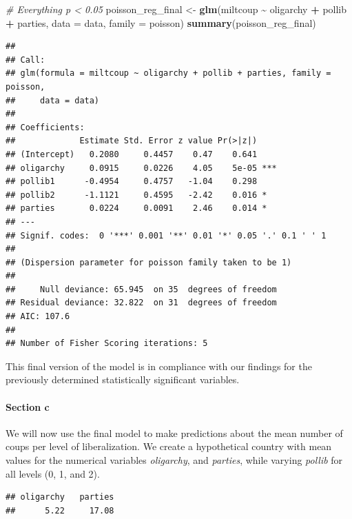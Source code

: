 \documentclass[
  11pt,
]{article}
\newenvironment{Shaded}{\begin{snugshade}}{\end{snugshade}}
\newcommand{\AttributeTok}[1]{\textcolor[rgb]{0.13,0.29,0.53}{#1}}
\newcommand{\CommentTok}[1]{\textcolor[rgb]{0.56,0.35,0.01}{\textit{#1}}}
\newcommand{\FunctionTok}[1]{\textcolor[rgb]{0.13,0.29,0.53}{\textbf{#1}}}
\newcommand{\NormalTok}[1]{#1}
\newcommand{\OtherTok}[1]{\textcolor[rgb]{0.56,0.35,0.01}{#1}}
\newcommand{\SpecialCharTok}[1]{\textcolor[rgb]{0.81,0.36,0.00}{\textbf{#1}}}
\begin{document}
\begin{Shaded}
\begin{Highlighting}[]
\CommentTok{\# Everything p \textless{} 0.05}
\NormalTok{poisson\_reg\_final }\OtherTok{\textless{}{-}} \FunctionTok{glm}\NormalTok{(miltcoup }\SpecialCharTok{\textasciitilde{}}\NormalTok{ oligarchy }\SpecialCharTok{+}\NormalTok{ pollib }\SpecialCharTok{+}\NormalTok{ parties, }
                    \AttributeTok{data =}\NormalTok{ data,}
                    \AttributeTok{family =}\NormalTok{ poisson)}
\FunctionTok{summary}\NormalTok{(poisson\_reg\_final)}
\end{Highlighting}
\end{Shaded}

\begin{verbatim}
## 
## Call:
## glm(formula = miltcoup ~ oligarchy + pollib + parties, family = poisson, 
##     data = data)
## 
## Coefficients:
##             Estimate Std. Error z value Pr(>|z|)    
## (Intercept)   0.2080     0.4457    0.47    0.641    
## oligarchy     0.0915     0.0226    4.05    5e-05 ***
## pollib1      -0.4954     0.4757   -1.04    0.298    
## pollib2      -1.1121     0.4595   -2.42    0.016 *  
## parties       0.0224     0.0091    2.46    0.014 *  
## ---
## Signif. codes:  0 '***' 0.001 '**' 0.01 '*' 0.05 '.' 0.1 ' ' 1
## 
## (Dispersion parameter for poisson family taken to be 1)
## 
##     Null deviance: 65.945  on 35  degrees of freedom
## Residual deviance: 32.822  on 31  degrees of freedom
## AIC: 107.6
## 
## Number of Fisher Scoring iterations: 5
\end{verbatim}

This final version of the model is in compliance with our findings for
the previously determined statistically significant variables.

\paragraph{Section c}\label{section-c-1}

We will now use the final model to make predictions about the mean
number of coups per level of liberalization. We create a hypothetical
country with mean values for the numerical variables \emph{oligarchy},
and \emph{parties}, while varying \emph{pollib} for all levels (0, 1,
and 2).

\begin{verbatim}
## oligarchy   parties 
##      5.22     17.08
\end{verbatim}
\end{document}

